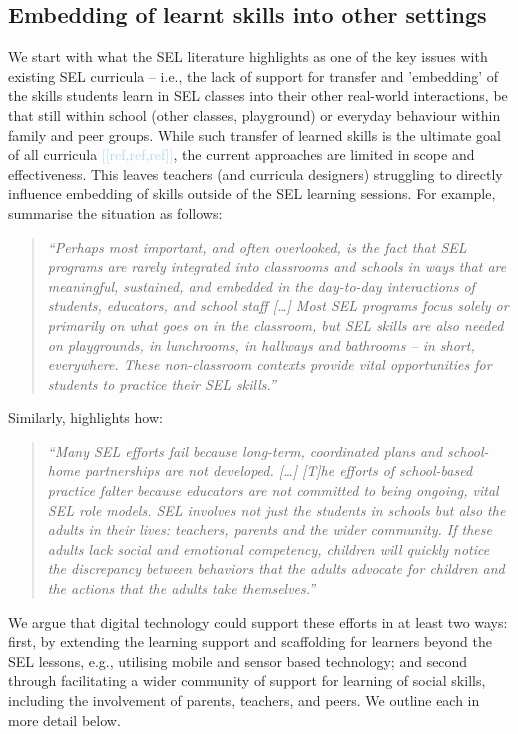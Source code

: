 \documentclass[prodmode,acmtochi]{acmsmall}
\newcommand{\todo}[1]{\textrm{\textrm{\textcolor{LightBlue}{[[#1]]}}}}
\newcommand{\qqq}[1]{\begin{quotation} \emph{``#1''} \end{quotation}}
\begin{document}
\subsection{Embedding of learnt skills into other settings}
\label{sec:embedding}
We start with what the SEL literature highlights as one of the key issues with existing SEL curricula -- i.e., the lack of support for transfer and 'embedding' of the skills students learn in SEL classes into their other real-world interactions, be that still within school (other classes, playground) or everyday behaviour within family and peer groups. 
%
While such transfer of learned skills is the ultimate goal of all curricula \todo{ref,ref,ref}, the current approaches are limited in scope and effectiveness. This leaves teachers (and curricula designers) struggling to directly influence embedding of skills outside of the SEL learning sessions.
%
For example,  summarise the situation as follows: \qqq{Perhaps most important, and often overlooked, is the fact that SEL programs are rarely integrated into classrooms and schools in ways that are meaningful, sustained, and embedded in the day-to-day interactions of students, educators, and school staff [\dots] Most SEL programs focus solely or primarily on what goes on in the classroom, but SEL skills are also needed on playgrounds, in lunchrooms, in hallways and bathrooms -- in short, everywhere. These non-classroom contexts provide vital opportunities for students to practice their SEL skills.}
%
Similarly,  highlights how: \qqq{Many SEL efforts fail because long-term, coordinated plans and school-home partnerships are not developed. [\dots] [T]he efforts of school-based practice falter because educators are not committed to being ongoing, vital SEL role models. SEL involves not just the students in schools but also the adults in their lives: teachers, parents and the wider community. If these adults lack social and emotional competency, children will quickly notice the discrepancy between behaviors that the adults advocate for children and the actions that the adults take themselves.}



We argue that digital technology could support these efforts in at least two ways: first, by extending the learning support and scaffolding for learners beyond the SEL lessons, e.g., utilising mobile and sensor based technology; and second through facilitating a wider community of support for learning of social skills, including the involvement of parents, teachers, and peers. We outline each in more detail below.
\end{document}
